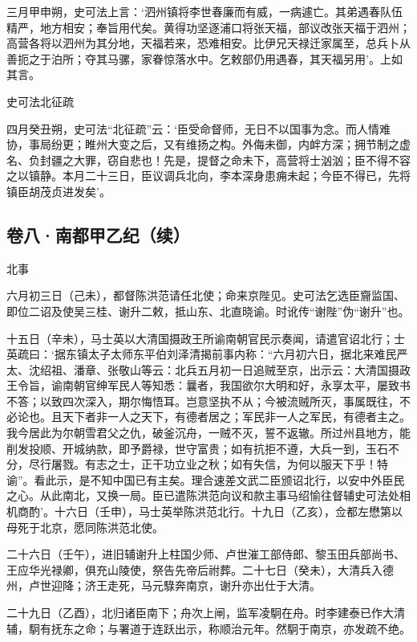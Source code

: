 \documentclass[]{article}
\begin{document}
三月甲申朔，史可法上言：`泗州镇将李世春廉而有威，一病遽亡。其弟遇春队伍精严，地方相安；奉旨用代矣。黄得功坚逐浦口将张天福，部议改张天福于泗州；高营各将以泗州为其分地，天福若来，恐难相安。比伊兄天禄迁家属至，总兵卜从善扼之于泊所；夺其马骡，家眷惊落水中。乞敕部仍用遇春，其天福另用'。上如其言。

史可法北征疏

四月癸丑朔，史可法``北征疏''云：`臣受命督师，无日不以国事为念。而人情难协，事局纷更；睢州大变之后，又有维扬之构。外侮未御，内衅方深；拥节制之虚名、负封疆之大罪，窃自悲也！先是，提督之命未下，高营将士汹汹；臣不得不容之以镇静。本月二十三日，臣议调兵北向，李本深身患痈未起；今臣不得已，先将镇臣胡茂贞进发矣'。

\hypertarget{header-n52}{%
\subsection{卷八·南都甲乙纪（续）}\label{header-n52}}

北事

六月初三日（己未），都督陈洪范请任北使；命来京陛见。史可法乞选臣齎监国、即位二诏及使吴三桂、谢升二敕，抵山东、北直晓谕。时讹传``谢陛''伪``谢升''也。

十五日（辛未），马士英以大清国摄政王所谕南朝官民示奏闻，请遣官诏北行；士英疏曰：`据东镇太子太师东平伯刘泽清揭前事内称：``六月初六日，据北来难民严太、沈绍祖、潘章、张敬山等云：北兵五月初一日追贼至京，出示云：大清国摄政王令旨，谕南朝官绅军民人等知悉：曩者，我国欲尔大明和好，永享太平，屡致书不答；以致四次深入，期尔悔悟耳。岂意坚执不从；今被流贼所灭，事属既往，不必论也。且天下者非一人之天下，有德者居之；军民非一人之军民，有德者主之。我今居此为尔朝雪君父之仇，破釜沉舟，一贼不灭，誓不返辙。所过州县地方，能削发投顺、开城纳款，即予爵禄，世守富贵；如有抗拒不遵，大兵一到，玉石不分，尽行屠戮。有志之士，正干功立业之秋；如有失信，为何以服天下乎！特谕''。看此示，是不知中国已有主矣。理合速差文武二臣颁诏北行，以安中外臣民之心。从此南北，又换一局。臣已遣陈洪范向议和款主事马绍愉往督辅史可法处相机商酌'。十六日（壬申），马士英举陈洪范北行。十九日（乙亥），佥都左懋第以母死于北京，愿同陈洪范北使。

二十六日（壬午），进旧辅谢升上柱国少师、卢世漼工部侍郎、黎玉田兵部尚书、王应华光禄卿，俱充山陵使，祭告先帝后祔葬。二十七日（癸未），大清兵入德州，卢世迎降；济王走死，马元騄奔南京，谢升亦出仕于大清。

二十九日（乙酉），北归诸臣南下；舟次上闸，监军凌駉在舟。时李建泰已作大清辅，駉有抚东之命；与署道于连跃出示，称顺治元年。然駉于南京，亦发疏不绝。
\end{document}
